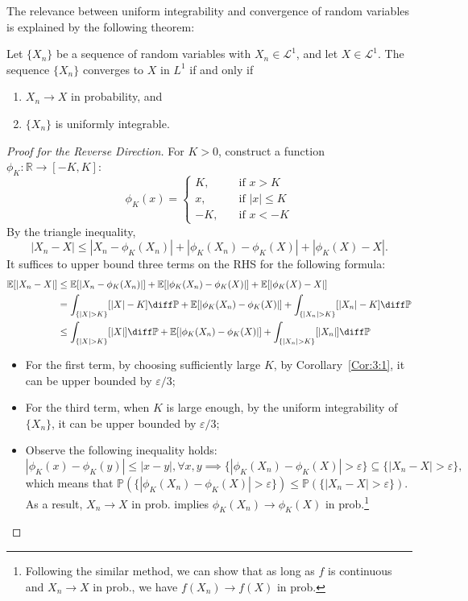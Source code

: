 The relevance between uniform integrability and convergence of random variables is explained by the following theorem:

\begin{theorem}\label{The:UI:Converge}
Let $\{X_n\}$ be a sequence of random variables with $X_n\in\mathcal{L}^1$, and let $X\in\mathcal{L}^1$.
The sequence $\{X_n\}$ converges to $X$ in ${L}^1$ if and only if
\begin{enumerate}
\item
$X_n\to X$ in probability, and
\item
$\{X_n\}$ is uniformly integrable.
\end{enumerate}
\end{theorem}
\begin{proof}[Proof for the Reverse Direction]
For $K>0$, construct a function $\phi_K:\mathbb{R}\to[-K,K]$:
\[
\phi_K(x)=\left\{
\begin{aligned}
K,&\quad\text{if $x>K$}\\
x,&\quad\text{if $|x|\le K$}\\
-K,&\quad\text{if $x<-K$}
\end{aligned}
\right.
\]
By the triangle inequality, 
\[
|X_n-X|\le |X_n - \phi_K(X_n)| + |\phi_K(X_n) - \phi_K(X)| + |\phi_K(X) - X|.
\]
It suffices to upper bound three terms on the RHS for the following formula:
\begin{align}
\mathbb{E}[|X_n-X|]&\le \mathbb{E}[|X_n - \phi_K(X_n)|]+\mathbb{E}[|\phi_K(X_n) - \phi_K(X)|]+\mathbb{E}[|\phi_K(X) - X|]\nonumber\\
&=\int_{\{|X|>K\}}[|X|-K]\diff\mathbb{P}+\mathbb{E}[|\phi_K(X_n) - \phi_K(X)|]+\int_{\{|X_n|>K\}}[|X_n|-K]\diff\mathbb{P}\nonumber\\
&\le \int_{\{|X|>K\}}[|X|]\diff\mathbb{P}+\mathbb{E}[|\phi_K(X_n) - \phi_K(X)|]+\int_{\{|X_n|>K\}}[|X_n|]\diff\mathbb{P}
\end{align}
\begin{itemize}
\item
For the first term, by choosing sufficiently large $K$, by Corollary~\ref{Cor:3:1}, it can be upper bounded by $\varepsilon/3$;
\item
For the third term, when $K$ is large enough, by the uniform integrability of $\{X_n\}$, it can be upper bounded by $\varepsilon/3$;
\item
Observe the following inequality holds: 
\[
|\phi_K(x) - \phi_K(y)|\le|x-y|,\forall x,y\implies
\{|\phi_K(X_n) - \phi_K(X)|>\varepsilon\}\subseteq\{|X_n-X|>\varepsilon\},
\]
which means that $\mathbb{P}(\{|\phi_K(X_n) - \phi_K(X)|>\varepsilon\})\le \mathbb{P}(\{|X_n-X|>\varepsilon\})$.
As a result, $X_n\to X$ in prob. implies $\phi_K(X_n)\to\phi_K(X)$ in prob.\footnote{Following the similar method, we can show that as long as $f$ is continuous and $X_n\to X$ in prob., we have $f(X_n)\to f(X)$ in prob.}


\end{itemize}
\end{proof}

